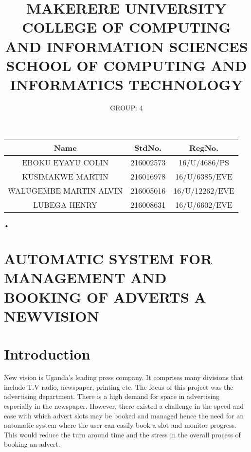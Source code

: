 \documentclass[12pt]{article}
\title{MAKERERE UNIVERSITY
COLLEGE OF COMPUTING AND INFORMATION SCIENCES
SCHOOL OF COMPUTING AND INFORMATICS TECHNOLOGY}
\author{GROUP: 4}
\begin{document}
\maketitle
\begin{table}[h!]
\begin{center}
\begin{tabular}{|c|c|c|}
\hline
\textbf{Name} & \textbf{StdNo.} & \textbf{RegNo.}\\
\hline
EBOKU EYAYU COLIN & 216002573 & 16/U/4686/PS\\
\hline
KUSIMAKWE MARTIN & 216016978 & 16/U/6385/EVE\\
\hline
WALUGEMBE MARTIN ALVIN & 216005016 & 16/U/12262/EVE\\
\hline
LUBEGA HENRY & 216008631 & 16/U/6602/EVE \\
\hline
\end{tabular}
\end{center}
\end{table}
\newpage
\begin{center}
•\section*{AUTOMATIC SYSTEM FOR MANAGEMENT AND BOOKING OF ADVERTS A NEWVISION}
\maketitle
\end{center}
\section{Introduction}
New vision is Uganda's leading press company. 
It comprises many divisions that include T.V radio, newspaper, printing etc. The focus of this project was the advertising department.
There is a high demand for space in advertising especially in the newspaper. However, there existed a challenge in the speed and ease with which advert slots may be booked and managed hence the need for an automatic system where the user can easily book a slot and monitor progress. This would reduce the turn around time and the stress in the overall process of booking an advert.\\
\end{document}
